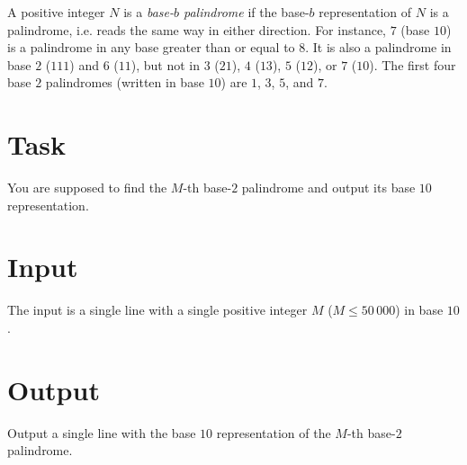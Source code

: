 A positive integer $N$ is a \emph{base-$b$ palindrome} if the base-$b$ representation of $N$ is a palindrome, i.e. reads the same way in either direction.
For instance, $7$ (base $10$) is a palindrome in any base greater than or equal to $8$.
It is also a palindrome in base $2$ ($111$) and $6$ ($11$), but not in $3$ ($21$), $4$ ($13$), $5$ ($12$), or $7$ ($10$).
The first four base $2$ palindromes (written in base $10$) are $1$, $3$, $5$, and $7$.

\section*{Task}
You are supposed to find the $M$-th base-$2$ palindrome and output its base $10$ representation.

\section*{Input}
The input is a single line with a single positive integer $M$ ($M \le 50\,000$) in base $10$.

\section*{Output}
Output a single line with the base $10$ representation of the $M$-th base-$2$ palindrome.
